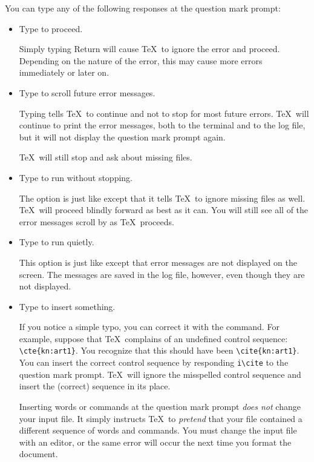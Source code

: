 You can type any of the following responses at the question mark
prompt:
\begin{itemize}

\item{Type  to proceed.}

Simply typing Return will cause \TeX\ to ignore the error and proceed.
Depending on the nature of the error, this may cause more errors
immediately or later on.

\item{Type  to scroll future error messages.}

Typing  tells \TeX\ to continue and not to stop for most future errors.
\TeX\ will continue to print the error messages, both to the terminal
and to the log file, but it will not display the question mark prompt
again.

\TeX\ will still stop and ask about missing files.

\item{Type  to run without stopping.}

The  option is just like  except that it tells \TeX\ to ignore
missing files as well.  \TeX\ will proceed blindly forward as best as it
can.  You will still see all of the error messages scroll by as \TeX\
proceeds.

\item{Type  to run quietly.}

This option is just like  except that error messages are not
displayed on the screen.  The messages are saved in the log
file, however, even though they are not displayed.

\item{Type  to insert something.}

If you notice a simple typo, you can correct it with the  command.
For example, suppose that \TeX\ complains of an undefined control
sequence: \verb|\cte{kn:art1}|.
You recognize that this should have 
been \verb|\cite{kn:art1}|.
You can insert the correct control sequence by responding
\verb|i\cite| to the question mark prompt.  \TeX\ will ignore the
misspelled control sequence and insert the (correct) sequence 
in its place.

Inserting words or commands at the question mark prompt \emph{does not}
change your input file.  It simply instructs \TeX\ to \emph{pretend} that your
file contained a different sequence of words and commands.  You must change
the input file with an editor, or the same error will occur the next time
you format the document.


\end{itemize}
